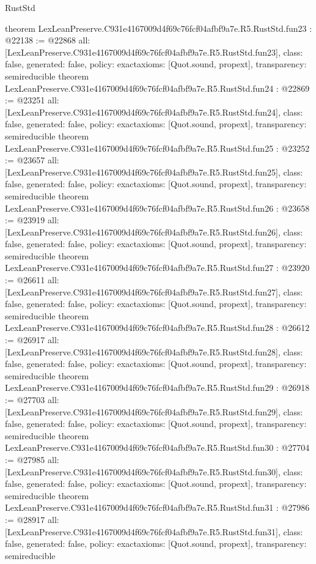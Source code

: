 \begin{lexlean}{RustStd}
\begin{coremodule}
{}
theorem LexLeanPreserve.C931e4167009d4f69c76fcf04afbf9a7e.R5.RustStd.fun23 : @22138 := @22868 {
  all: [LexLeanPreserve.C931e4167009d4f69c76fcf04afbf9a7e.R5.RustStd.fun23],
  class: false,
  generated: false,
  policy: exact{axioms: [Quot.sound, propext]},
  transparency: semireducible
}
theorem LexLeanPreserve.C931e4167009d4f69c76fcf04afbf9a7e.R5.RustStd.fun24 : @22869 := @23251 {
  all: [LexLeanPreserve.C931e4167009d4f69c76fcf04afbf9a7e.R5.RustStd.fun24],
  class: false,
  generated: false,
  policy: exact{axioms: [Quot.sound, propext]},
  transparency: semireducible
}
theorem LexLeanPreserve.C931e4167009d4f69c76fcf04afbf9a7e.R5.RustStd.fun25 : @23252 := @23657 {
  all: [LexLeanPreserve.C931e4167009d4f69c76fcf04afbf9a7e.R5.RustStd.fun25],
  class: false,
  generated: false,
  policy: exact{axioms: [Quot.sound, propext]},
  transparency: semireducible
}
theorem LexLeanPreserve.C931e4167009d4f69c76fcf04afbf9a7e.R5.RustStd.fun26 : @23658 := @23919 {
  all: [LexLeanPreserve.C931e4167009d4f69c76fcf04afbf9a7e.R5.RustStd.fun26],
  class: false,
  generated: false,
  policy: exact{axioms: [Quot.sound, propext]},
  transparency: semireducible
}
theorem LexLeanPreserve.C931e4167009d4f69c76fcf04afbf9a7e.R5.RustStd.fun27 : @23920 := @26611 {
  all: [LexLeanPreserve.C931e4167009d4f69c76fcf04afbf9a7e.R5.RustStd.fun27],
  class: false,
  generated: false,
  policy: exact{axioms: [Quot.sound, propext]},
  transparency: semireducible
}
theorem LexLeanPreserve.C931e4167009d4f69c76fcf04afbf9a7e.R5.RustStd.fun28 : @26612 := @26917 {
  all: [LexLeanPreserve.C931e4167009d4f69c76fcf04afbf9a7e.R5.RustStd.fun28],
  class: false,
  generated: false,
  policy: exact{axioms: [Quot.sound, propext]},
  transparency: semireducible
}
theorem LexLeanPreserve.C931e4167009d4f69c76fcf04afbf9a7e.R5.RustStd.fun29 : @26918 := @27703 {
  all: [LexLeanPreserve.C931e4167009d4f69c76fcf04afbf9a7e.R5.RustStd.fun29],
  class: false,
  generated: false,
  policy: exact{axioms: [Quot.sound, propext]},
  transparency: semireducible
}
theorem LexLeanPreserve.C931e4167009d4f69c76fcf04afbf9a7e.R5.RustStd.fun30 : @27704 := @27985 {
  all: [LexLeanPreserve.C931e4167009d4f69c76fcf04afbf9a7e.R5.RustStd.fun30],
  class: false,
  generated: false,
  policy: exact{axioms: [Quot.sound, propext]},
  transparency: semireducible
}
theorem LexLeanPreserve.C931e4167009d4f69c76fcf04afbf9a7e.R5.RustStd.fun31 : @27986 := @28917 {
  all: [LexLeanPreserve.C931e4167009d4f69c76fcf04afbf9a7e.R5.RustStd.fun31],
  class: false,
  generated: false,
  policy: exact{axioms: [Quot.sound, propext]},
  transparency: semireducible
}
\end{coremodule}
\end{lexlean}
